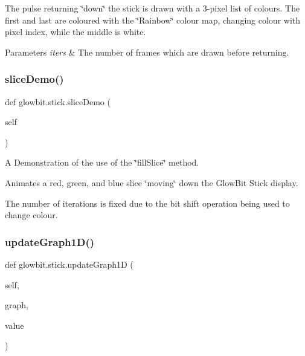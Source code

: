 The pulse returning \char`\"{}down\char`\"{} the stick is drawn with a 3-\/pixel list of colours. The first and last are coloured with the \char`\"{}\+Rainbow\char`\"{} colour map, changing colour with pixel index, while the middle is white.


\begin{DoxyParams}{Parameters}
{\em iters} & The number of frames which are drawn before returning. \\
\hline
\end{DoxyParams}
\mbox{\label{classglowbit_1_1stick_a26eedb25d40d67d1e2ca786a7b8eb8b0}} 
\subsubsection{\texorpdfstring{slice\+Demo()}{sliceDemo()}}
{\footnotesize\ttfamily def glowbit.\+stick.\+slice\+Demo (\begin{DoxyParamCaption}\item[{}]{self }\end{DoxyParamCaption})}



A Demonstration of the use of the \char`\"{}fill\+Slice\char`\"{} method. 

Animates a red, green, and blue slice \char`\"{}moving\char`\"{} down the Glow\+Bit Stick display.

The number of iterations is fixed due to the bit shift operation being used to change colour. \mbox{\label{classglowbit_1_1stick_acde1622da63c602b209a608384cb6020}} 
\subsubsection{\texorpdfstring{update\+Graph1\+D()}{updateGraph1D()}}
{\footnotesize\ttfamily def glowbit.\+stick.\+update\+Graph1D (\begin{DoxyParamCaption}\item[{}]{self,  }\item[{}]{graph,  }\item[{}]{value }\end{DoxyParamCaption})}



